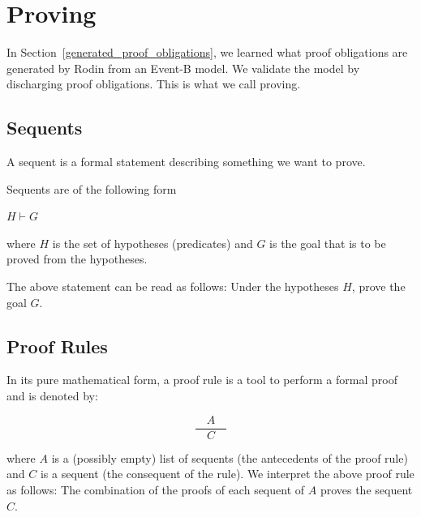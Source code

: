 \clearpage
\section{Proving}
\label{proving}

In Section~\ref{generated_proof_obligations}, we learned what proof obligations are generated by Rodin from an Event-B model.  We validate the model by discharging proof obligations.  This is what we call proving.


\subsection{Sequents}
\label{sequents}

A sequent is a formal statement describing something we want to prove.

Sequents are of the following form 

$H \vdash G$

where $H$ is the set of hypotheses (predicates) and $G$ is the goal that is to be proved from the hypotheses.

The above statement can be read as follows: Under the hypotheses $H$, prove the goal $G$.

\subsection{Proof Rules}
\label{proof_rules}

In its pure mathematical form, a proof rule is a tool to perform a formal proof and is denoted by: 

$$\frac{\quad A\quad}{C}$$

where $A$ is a (possibly empty) list of sequents (the antecedents of the proof rule) and $C$ is a sequent (the consequent of the rule). We interpret the above proof rule as follows: The combination of the proofs of each sequent of $A$ proves the sequent $C$.

